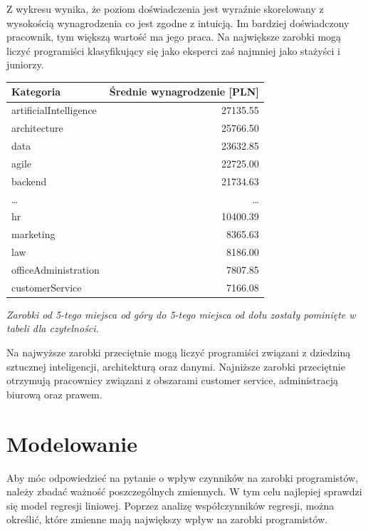\documentclass{article}
\begin{document}
Z wykresu wynika, że poziom doświadczenia jest wyraźnie skorelowany z wysokością wynagrodzenia co jest zgodne z intuicją.
Im bardziej doświadczony pracownik, tym większą wartość ma jego praca.
Na największe zarobki mogą liczyć programiści klasyfikujący się jako eksperci zaś najmniej jako stażyści i juniorzy.

\begin{table}[H]
    \centering
    \begin{tabular}{|l|r|}
        \hline
        \textbf{Kategoria} & \textbf{Średnie wynagrodzenie [PLN]} \\ \hline
        artificialIntelligence & 27135.55 \\ \hline
        architecture & 25766.50 \\ \hline
        data & 23632.85 \\ \hline
        agile & 22725.00 \\ \hline
        backend & 21734.63 \\ \hline
        \dots & \dots \\ \hline
        hr & 10400.39 \\ \hline
        marketing & 8365.63 \\ \hline
        law & 8186.00 \\ \hline
        officeAdministration & 7807.85 \\ \hline
        customerService & 7166.08 \\ \hline
    \end{tabular}
\end{table}

\textit{Zarobki od 5-tego miejsca od góry do 5-tego miejsca od dołu zostały pominięte w tabeli dla czytelności.}

\medskip

Na najwyższe zarobki przeciętnie mogą liczyć programiści związani z dziedziną sztucznej inteligencji, architekturą oraz danymi.
Najniższe zarobki przeciętnie otrzymują pracownicy związani z obszarami customer service, administracją biurową oraz prawem.

\section{Modelowanie}

Aby móc odpowiedzieć na pytanie o wpływ czynników na zarobki programistów, należy zbadać ważność poszczególnych zmiennych.
W tym celu najlepiej sprawdzi się model regresji liniowej. Poprzez analizę współczynników regresji, można określić, które zmienne mają największy wpływ na zarobki programistów.
\end{document}
